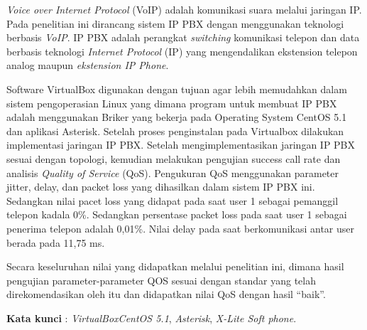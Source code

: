 \documentclass{jtetiproposalskripsi}
\begin{document}
\cover

\approvalpage


\begin{abstractind}
\emph{Voice over Internet Protocol} (VoIP) adalah komunikasi suara melalui jaringan IP. Pada penelitian ini dirancang sistem IP PBX dengan menggunakan teknologi berbasis \emph{VoIP}. IP PBX adalah perangkat \emph{switching} komunikasi telepon dan data berbasis teknologi \emph{Internet Protocol} (IP) yang mengendalikan ekstension telepon analog maupun \emph{ekstension IP Phone}. 

Software VirtualBox digunakan dengan tujuan agar lebih memudahkan dalam sistem pengoperasian Linux yang dimana program untuk membuat IP PBX adalah menggunakan Briker yang bekerja pada Operating System CentOS 5.1 dan aplikasi Asterisk. Setelah proses penginstalan pada Virtualbox dilakukan implementasi jaringan IP PBX. Setelah mengimplementasikan jaringan IP PBX sesuai dengan topologi, kemudian melakukan pengujian success call rate dan analisis \emph{Quality of Service} (QoS). Pengukuran QoS menggunakan parameter jitter, delay, dan packet loss yang dihasilkan dalam sistem IP PBX ini. Sedangkan nilai pacet loss yang didapat pada saat user 1 sebagai pemanggil telepon kadala 0\%. Sedangkan persentase packet loss pada saat user 1 sebagai penerima telepon adalah 0,01\%. Nilai delay pada saat berkomunikasi antar user berada pada 11,75 ms.

Secara keseluruhan nilai yang didapatkan melalui penelitian ini, dimana hasil pengujian parameter-parameter QOS sesuai dengan standar yang telah direkomendasikan oleh itu dan didapatkan nilai QoS dengan hasil “baik”.


\bigskip
\textbf{Kata kunci} : \emph{VirtualBox}\emph{CentOS 5.1}, \emph{Asterisk}, \emph{X-Lite Soft phone}.
\end{abstractind}

\tableofcontents
{}
\clearpage{}\setcounter{page}{1}
\end{document}
